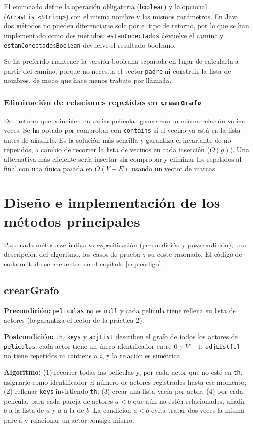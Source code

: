\documentclass[a4paper,11pt]{report}
\newcommand{\espec}[2]{\par\noindent\textbf{Precondición:} #1\par\noindent\textbf{Postcondición:} #2\par}
\newcommand{\algoritmo}[1]{\par\noindent\textbf{Algoritmo:} #1\par}
\begin{document}
El enunciado define la operación obligatoria (\texttt{boolean}) y la opcional (\texttt{Array\allowbreak List<String>}) con el mismo nombre y los mismos parámetros. En Java dos métodos no pueden diferenciarse solo por el tipo de retorno, por lo que se han implementado como dos métodos: \texttt{estanConectados} devuelve el camino y \texttt{estanConectadosBoolean} devuelve el resultado booleano.

Se ha preferido mantener la versión booleana separada en lugar de calcularla a partir del camino, porque no necesita el vector \texttt{padre} ni construir la lista de nombres, de modo que hace menos trabajo por llamada.

\subsection{Eliminación de relaciones repetidas en \texttt{crearGrafo}}

Dos actores que coinciden en varias películas generarían la misma relación varias veces. Se ha optado por comprobar con \texttt{contains} si el vecino ya está en la lista antes de añadirlo. Es la solución más sencilla y garantiza el invariante de no repetidos, a cambio de recorrer la lista de vecinos en cada inserción ($O(g)$). Una alternativa más eficiente sería insertar sin comprobar y eliminar los repetidos al final con una única pasada en $O(V+E)$ usando un vector de marcas.

\chapter{\label{cap:metodos}Diseño e implementación de los métodos principales}

Para cada método se indica su especificación (precondición y postcondición), una descripción del algoritmo, los casos de prueba y su coste razonado. El código de cada método se encuentra en el capítulo \ref{cap:codigo}.

\section{\label{crearGrafo}crearGrafo}
\espec{\texttt{peliculas} no es \texttt{null} y cada película tiene rellena su lista de actores (lo garantiza el lector de la práctica 2).}
{\texttt{th}, \texttt{keys} y \texttt{adjList} describen el grafo de todos los actores de \texttt{peliculas}; cada actor tiene un único identificador entre $0$ y $V-1$; \texttt{adjList[i]} no tiene repetidos ni contiene a $i$, y la relación es simétrica.}
\algoritmo{(1) recorrer todas las películas y, por cada actor que no esté en \texttt{th}, asignarle como identificador el número de actores registrados hasta ese momento; (2) rellenar \texttt{keys} invirtiendo \texttt{th}; (3) crear una lista vacía por actor; (4) por cada película, para cada pareja de actores $a < b$ que aún no estén relacionados, añadir $b$ a la lista de $a$ y $a$ a la de $b$. La condición $a < b$ evita tratar dos veces la misma pareja y relacionar un actor consigo mismo.}
\end{document}

